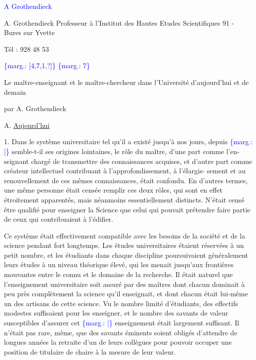 \documentclass[11pt]{article}
\newcommand{\scanpage}[1]{\par\bigskip\noindent{\small\sffamily[scan #1]}\par}
\newcommand{\mspage}[1]{{\small\sffamily[p.\,#1]}}
\newcommand{\hand}[1]{\textcolor{blue}{#1}}
\newcommand{\margin}[1]{\textcolor{blue}{\{\textsf{marg.:} #1\}}}
\newcommand{\uline}[1]{\underline{#1}}
\newcommand{\unsure}[1]{[#1?]}
\begin{document}
\hand{A Grothendieck}

A. Grothendieck
Professeur à l'Institut des
Hautes Etudes Scientifiques
91 - Bures sur Yvette

Tél : 928 48 53

\mspage{\hand{252}}

\clearpage
\scanpage{119/254}
\margin{\unsure{4,7,1,}} %
\margin{7}

Le maître-enseignant et le maître-chercheur dans
l'Université d'aujourd'hui et de demain

par A. Grothendieck

A. \uline{Aujourd'hui}

1. Dans le système universitaire tel qu'il a existé jusqu'à nos jours, depuis
\margin{|} semble-t-il ses origines lointaines, le rôle du maître, d'une part comme l'en-%
seignant chargé de transmettre des connaissances acquises, et d'autre part
comme créateur intellectuel contribuant à l'approfondissement, à l'élargis-%
sement et au renouvellement de ces mêmes connaissances, était confondu. En
d'autres termes, une même personne était censée remplir ces deux rôles, qui
sont en effet étroitement apparentés, mais néanmoins essentiellement distincts.
N'était censé être qualifié pour enseigner la Science que celui qui pouvait
prétendre faire partie de ceux qui contribuaient à l'édifier.

Ce système était effectivement compatible avec les besoins de la
société et de la science pendant fort longtemps. Les études universitaires
étaient réservées à un petit nombre, et les étudiants dans chaque discipline
poursuivaient généralement leurs études à un niveau théorique élevé, qui les
menait jusqu'aux frontières mouvantes entre le connu et le domaine de la
recherche. Il était naturel que l'enseignement universitaire soit assuré par
des maîtres dont chacun dominait à peu près complètement la science qu'il
enseignait, et dont chacun était lui-même un des artisans de cette science.
Vu le nombre limité d'étudiants, des effectifs modestes suffisaient pour les
enseigner, et le nombre des savants de valeur susceptibles d'assurer cet
\margin{|} enseignement était largement suffisant. Il n'était pas rare, même, que des
savants éminents soient obligés d'attendre de longues années la retraite d'un
de leurs collègues pour pouvoir occuper une position de titulaire de chaire
à la mesure de leur valeur.
\end{document}
